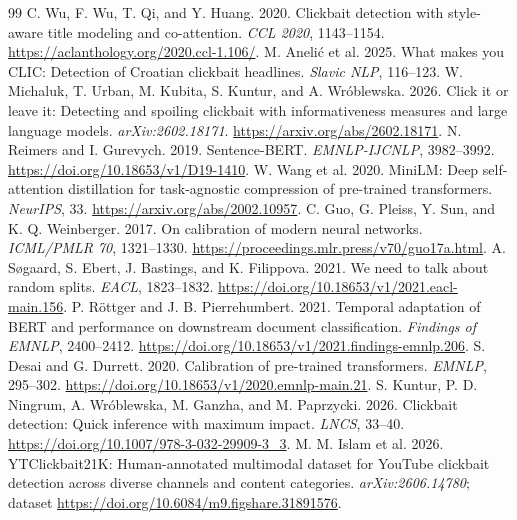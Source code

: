 \documentclass[11pt]{article}
\begin{document}
\begin{thebibliography}{99}
 C. Wu, F. Wu, T. Qi, and Y. Huang. 2020. Clickbait detection with style-aware title modeling and co-attention. \emph{CCL 2020}, 1143--1154. \url{https://aclanthology.org/2020.ccl-1.106/}.
 M. An\dj eli\'c et al. 2025. What makes you CLIC: Detection of Croatian clickbait headlines. \emph{Slavic NLP}, 116--123.
 W. Michaluk, T. Urban, M. Kubita, S. Kuntur, and A. Wr\'oblewska. 2026. Click it or leave it: Detecting and spoiling clickbait with informativeness measures and large language models. \emph{arXiv:2602.18171}. \url{https://arxiv.org/abs/2602.18171}.
 N. Reimers and I. Gurevych. 2019. Sentence-BERT. \emph{EMNLP-IJCNLP}, 3982--3992. \url{https://doi.org/10.18653/v1/D19-1410}.
 W. Wang et al. 2020. MiniLM: Deep self-attention distillation for task-agnostic compression of pre-trained transformers. \emph{NeurIPS}, 33. \url{https://arxiv.org/abs/2002.10957}.
 C. Guo, G. Pleiss, Y. Sun, and K. Q. Weinberger. 2017. On calibration of modern neural networks. \emph{ICML/PMLR 70}, 1321--1330. \url{https://proceedings.mlr.press/v70/guo17a.html}.
 A. S\o gaard, S. Ebert, J. Bastings, and K. Filippova. 2021. We need to talk about random splits. \emph{EACL}, 1823--1832. \url{https://doi.org/10.18653/v1/2021.eacl-main.156}.
 P. R\"ottger and J. B. Pierrehumbert. 2021. Temporal adaptation of BERT and performance on downstream document classification. \emph{Findings of EMNLP}, 2400--2412. \url{https://doi.org/10.18653/v1/2021.findings-emnlp.206}.
 S. Desai and G. Durrett. 2020. Calibration of pre-trained transformers. \emph{EMNLP}, 295--302. \url{https://doi.org/10.18653/v1/2020.emnlp-main.21}.
 S. Kuntur, P. D. Ningrum, A. Wr\'oblewska, M. Ganzha, and M. Paprzycki. 2026. Clickbait detection: Quick inference with maximum impact. \emph{LNCS}, 33--40. \url{https://doi.org/10.1007/978-3-032-29909-3_3}.
 M. M. Islam et al. 2026. YTClickbait21K: Human-annotated multimodal dataset for YouTube clickbait detection across diverse channels and content categories. \emph{arXiv:2606.14780}; dataset \url{https://doi.org/10.6084/m9.figshare.31891576}.
\end{thebibliography}
\end{document}
